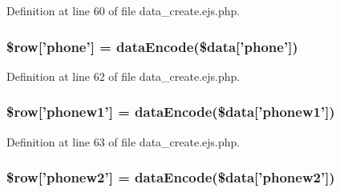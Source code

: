 \-Definition at line 60 of file data\-\_\-create.\-ejs.\-php.

\hypertarget{miscellaneous_2mysettings_2data__create_8ejs_8php_a9eb773d64ffa16faf1e29ccbaf4f065c}{
\subsubsection[{\$row}]{\setlength{\rightskip}{0pt plus 5cm}\$row\mbox{[}'phone'\mbox{]} = {\bf data\-Encode}(\$data\mbox{[}'phone'\mbox{]})}}\label{miscellaneous_2mysettings_2data__create_8ejs_8php_a9eb773d64ffa16faf1e29ccbaf4f065c}


\-Definition at line 62 of file data\-\_\-create.\-ejs.\-php.

\hypertarget{miscellaneous_2mysettings_2data__create_8ejs_8php_abd903592f46e704ef4bf1d9b96891334}{
\subsubsection[{\$row}]{\setlength{\rightskip}{0pt plus 5cm}\$row\mbox{[}'phonew1'\mbox{]} = {\bf data\-Encode}(\$data\mbox{[}'phonew1'\mbox{]})}}\label{miscellaneous_2mysettings_2data__create_8ejs_8php_abd903592f46e704ef4bf1d9b96891334}


\-Definition at line 63 of file data\-\_\-create.\-ejs.\-php.

\hypertarget{miscellaneous_2mysettings_2data__create_8ejs_8php_ac8ae8c92d60ba675fbaeda33916b1ecb}{
\subsubsection[{\$row}]{\setlength{\rightskip}{0pt plus 5cm}\$row\mbox{[}'phonew2'\mbox{]} = {\bf data\-Encode}(\$data\mbox{[}'phonew2'\mbox{]})}}\label{miscellaneous_2mysettings_2data__create_8ejs_8php_ac8ae8c92d60ba675fbaeda33916b1ecb}


